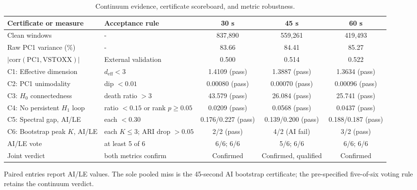 
\begin{table}[t]
\centering
\caption{Continuum evidence, certificate scoreboard, and metric robustness.}
\label{tab:continuum_scoreboard}
\scriptsize
\setlength{\tabcolsep}{3.5pt}
\begin{tabular}{llccc}
\toprule
Certificate or measure & Acceptance rule & 30 s & 45 s & 60 s\\
\midrule
Clean windows & - & 837,890 & 559,261 & 419,493\\
Raw PC1 variance (\%) & - & 83.66 & 84.41 & 85.27\\
$|\mathrm{corr}(\mathrm{PC1},\mathrm{VSTOXX})|$ &
External validation & 0.500 & 0.514 & 0.522\\
\midrule
C1: Effective dimension & $d_{\mathrm{eff}}<3$ &
1.4109 (pass) & 1.3887 (pass) & 1.3634 (pass)\\
C2: PC1 unimodality & dip $<0.01$ &
0.00080 (pass) & 0.00070 (pass) & 0.00096 (pass)\\
C3: $H_0$ connectedness & death ratio $>3$ &
43.579 (pass) & 26.084 (pass) & 25.741 (pass)\\
C4: No persistent $H_1$ loop & ratio $<0.15$ or rank $p\geq0.05$ &
0.0209 (pass) & 0.0568 (pass) & 0.0437 (pass)\\
C5: Spectral gap, AI/LE & each $<0.30$ &
0.176/0.227 (pass) & 0.139/0.200 (pass) & 0.188/0.187 (pass)\\
C6: Bootstrap peak $K$, AI/LE & each $K\leq3$; ARI drop $>0.05$ &
2/2 (pass) & 4/2 (AI fail) & 3/2 (pass)\\
\midrule
AI/LE vote & at least 5 of 6 &
6/6; 6/6 & 5/6; 6/6 & 6/6; 6/6\\
Joint verdict & both metrics confirm &
Confirmed & Confirmed, qualified & Confirmed\\
\bottomrule
\end{tabular}
\begin{minipage}{0.94\linewidth}\footnotesize
Paired entries report AI/LE values.  The sole pooled miss is the 45-second AI
bootstrap certificate; the pre-specified five-of-six voting rule retains the
continuum verdict.
\end{minipage}
\end{table}
